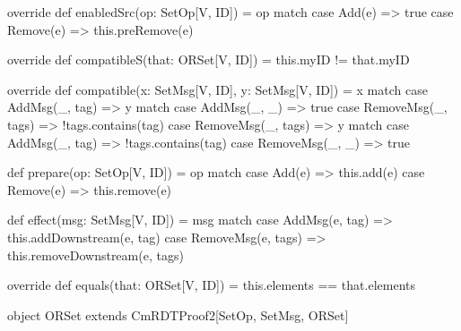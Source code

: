 \begin{Scala}
{  override def enabledSrc(op: SetOp[V, ID]) = op match {
    case Add(e) => true
    case Remove(e) => this.preRemove(e)
  }

  override def compatibleS(that: ORSet[V, ID]) = {
    this.myID != that.myID
  }

  override def compatible(x: SetMsg[V, ID], y: SetMsg[V, ID]) = x match {
    case AddMsg(_, tag) => {
      y match {
        case AddMsg(_, _) => true
        case RemoveMsg(_, tags) => !tags.contains(tag)
      }
    }
    case RemoveMsg(_, tags) => {
      y match {
        case AddMsg(_, tag) => !tags.contains(tag)
        case RemoveMsg(_, _) => true
      }
    }
  }

  def prepare(op: SetOp[V, ID]) = op match {
    case Add(e) => this.add(e)
    case Remove(e) => this.remove(e)
  }

  def effect(msg: SetMsg[V, ID]) = msg match {
    case AddMsg(e, tag) => this.addDownstream(e, tag)
    case RemoveMsg(e, tags) => this.removeDownstream(e, tags)
  }

  override def equals(that: ORSet[V, ID]) = {
    this.elements == that.elements
  }
}

object ORSet extends CmRDTProof2[SetOp, SetMsg, ORSet]
\end{Scala}
